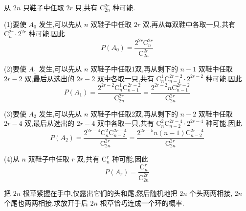 \begin{solution}
    从 $2n$ 只鞋子中任取 $2r$ 只,共有 $\mathrm{C}_{2n}^{2r}$ 种可能.

    (1)要使 $A_0$ 发生,可以先从 $n$ 双鞋子中任取 $2r$ 双,再从每双鞋中各取一只,共有 $\mathrm{C}_n^{2r} \cdot 2^{2r}$ 种可能.因此
    $$
    P(A_0) = \dfrac{2^{2r} \mathrm{C}_n^{2r}}{\mathrm{C}_{2n}^{2r}}
    $$

    (2)要使 $A_1$ 发生,可以先从 $n$ 双鞋子中任取1双,再从剩下的 $n-1$ 双鞋中任取 $2r-2$ 双,最后从选出的 $2r-2$ 双中各取一只,共有 $\mathrm{C}_n^1 \mathrm{C}_{n-1}^{2r-2} \cdot 2^{2r-2}$ 种可能.因此
    $$
    P(A_1) = \dfrac{2^{2r-2} \mathrm{C}_n^1 \mathrm{C}_{n-1}^{2r-2}}{\mathrm{C}_{2n}^{2r}} = \dfrac{2^{2r-2} n \mathrm{C}_{n-1}^{2r-2}}{\mathrm{C}_{2n}^{2r}}
    $$

    (3)要使 $A_2$ 发生,可以先从 $n$ 双鞋子中任取2双,再从剩下的 $n-2$ 双鞋中任取 $2r-4$ 双,最后从选出的 $2r-4$ 双中各取一只,共有 $\mathrm{C}_n^2 \mathrm{C}_{n-2}^{2r-4} \cdot 2^{2r-4}$ 种可能.因此
    $$
    P(A_2) = \dfrac{2^{2r-4} \mathrm{C}_n^2 \mathrm{C}_{n-2}^{2r-4}}{\mathrm{C}_{2n}^{2r}} = \dfrac{2^{2r-5} n(n-1) \mathrm{C}_{n-2}^{2r-4}}{\mathrm{C}_{2n}^{2r}}
    $$

    (4)从 $n$ 双鞋子中任取 $r$ 双,共有 $\mathrm{C}_n^r$ 种可能,因此
    $$
    P(A_r) = \dfrac{\mathrm{C}_n^r}{\mathrm{C}_{2n}^{2r}}
    $$
\end{solution}

\question[接草成环问题] 把 $2n$ 根草紧握在手中,仅露出它们的头和尾,然后随机地把 $2n$ 个头两两相接, $2n$ 个尾也两两相接.求放开手后 $2n$ 根草恰巧连成一个环的概率.

